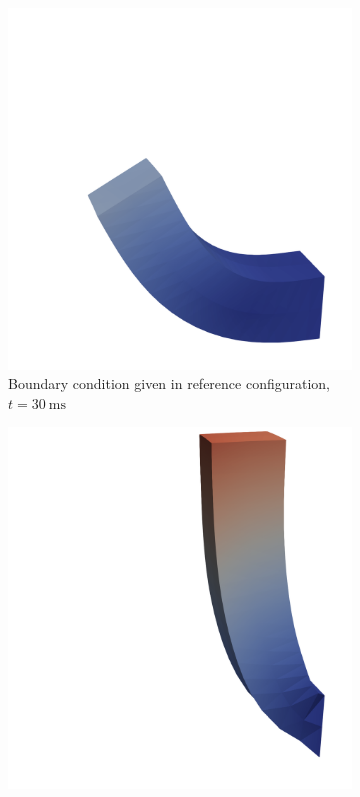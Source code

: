 \begin{figure}
\begin{subfigure}[t]{0.31\textwidth}
    \includegraphics[width=\textwidth]{images/implementation/reference_configuration_2_cropped.png}
    \caption{Boundary condition given in reference configuration, $t=\SI{30}{\milli\second}$}%
    \label{fig:reference_configuration_2}%
  \end{subfigure}
  \quad
  \begin{subfigure}[t]{0.31\textwidth}%
    \centering%
    \includegraphics[width=\textwidth]{images/implementation/reference_configuration_3_cropped.png}

\end{subfigure}
\end{figure}
